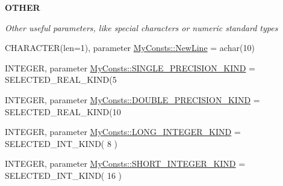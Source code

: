 \begin{Indent}{\bf OTHER}\par
{\em \label{_amgrp03570470bad94692ce93e32700d2e1cb}
Other useful parameters, like special characters or numeric standard types \par
 }\begin{DoxyCompactItemize}
\item 
CHARACTER(len=1), parameter \hyperlink{namespace_my_consts_a9a8e9aee6b2dd00efffbdb0957a48628}{MyConsts::NewLine} = achar(10)
\item 
INTEGER, parameter \hyperlink{namespace_my_consts_a293023fa7183e7f030a565aab4319d39}{MyConsts::SINGLE\_\-PRECISION\_\-KIND} = SELECTED\_\-REAL\_\-KIND(5
\item 
INTEGER, parameter \hyperlink{namespace_my_consts_a692521408a6d0a60e684c2dc67c804ab}{MyConsts::DOUBLE\_\-PRECISION\_\-KIND} = SELECTED\_\-REAL\_\-KIND(10
\item 
INTEGER, parameter \hyperlink{namespace_my_consts_a2d3348d585376d97fd760ceea81f0b65}{MyConsts::LONG\_\-INTEGER\_\-KIND} = SELECTED\_\-INT\_\-KIND( 8 )
\item 
INTEGER, parameter \hyperlink{namespace_my_consts_a12ff6515269f67ce554ac8d092a2119e}{MyConsts::SHORT\_\-INTEGER\_\-KIND} = SELECTED\_\-INT\_\-KIND( 16 )
\end{DoxyCompactItemize}
\end{Indent}
